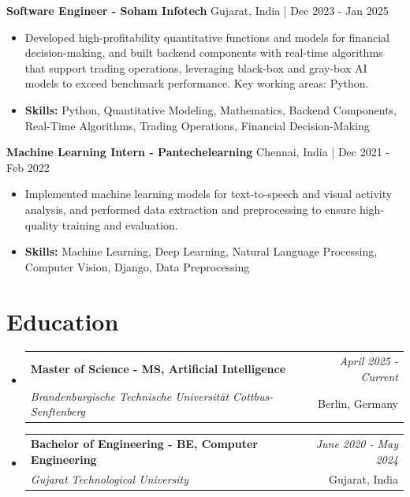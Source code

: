 \documentclass[a4paper,11pt]{article}
\makeatletter
\newcommand{\resumeSubheading}[4]{
\vspace{0.5mm}\item
    \begin{tabular*}{\linewidth}[t]{l@{\extracolsep{\fill}}r}
        \textbf{#1} & \textit{\footnotesize{#4}} \\
        \textit{\footnotesize{#3}} &  \footnotesize{#2}\\
    \end{tabular*}
    \vspace{-2.4mm}
}
\makeatother
\begin{document}
\vspace{1mm}
  \textbf{Software Engineer - Soham Infotech} \hfill Gujarat, India | Dec 2023 - Jan 2025
\vspace{-1.5mm} %
\begin{itemize}
  \item Developed high-profitability quantitative functions and models for financial decision-making, and built backend components with real-time algorithms that support trading operations, leveraging black-box and gray-box AI models to exceed benchmark performance. Key working areas: Python.

\vspace{-2mm}
  \item \textbf{Skills:} Python, Quantitative Modeling, Mathematics, Backend Components, Real-Time Algorithms, Trading Operations, Financial Decision-Making
\end{itemize}

\vspace{1mm}
  \textbf{Machine Learning Intern - Pantechelearning} \hfill Chennai, India | Dec 2021 - Feb 2022
\vspace{-1.5mm} %
\begin{itemize}
  \item Implemented machine learning models for text-to-speech and visual activity analysis, and performed data extraction and preprocessing to ensure high-quality training and evaluation.
\vspace{-2mm}
  \item \textbf{Skills:} Machine Learning, Deep Learning, Natural Language Processing, Computer Vision, Django, Data Preprocessing
\end{itemize}\section{\textbf{Education}}
\vspace{-0.4mm}

\begin{itemize}[leftmargin=0.15in, label={}]
\resumeSubheading
{Master of Science - MS, Artificial Intelligence }{Berlin, Germany}
{Brandenburgische Technische Universität Cottbus-Senftenberg  }{April 2025 - Current}

\vspace{1.0mm} %
\resumeSubheading
{Bachelor of Engineering - BE, Computer Engineering  }{Gujarat, India}
{Gujarat Technological University }{June 2020 - May 2024}

\end{itemize}
\end{document}
